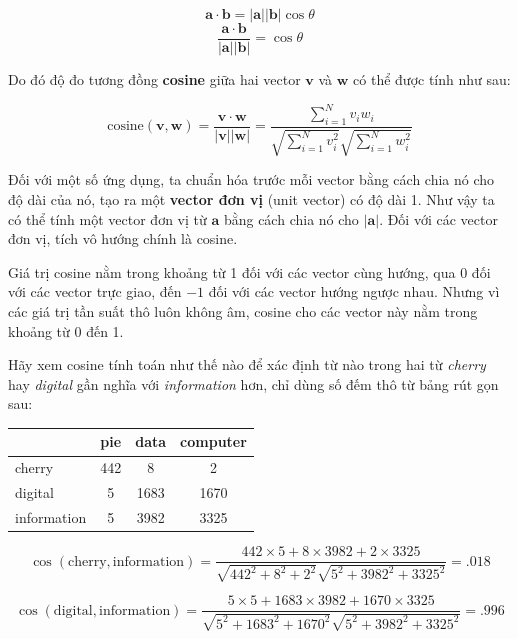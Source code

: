 \begin{equation}
\mathbf{a} \cdot \mathbf{b} = |\mathbf{a}||\mathbf{b}| \cos \theta \tag{5.9}
\end{equation}
$$
\frac{\mathbf{a} \cdot \mathbf{b}}{|\mathbf{a}||\mathbf{b}|} = \cos \theta
$$

Do đó độ đo tương đồng \textbf{cosine} giữa hai vector $\mathbf{v}$ và $\mathbf{w}$ có thể được tính như sau:

\begin{equation}
\text{cosine}(\mathbf{v}, \mathbf{w}) = \frac{\mathbf{v} \cdot \mathbf{w}}{|\mathbf{v}||\mathbf{w}|} = \frac{\sum_{i=1}^{N} v_i w_i}{\sqrt{\sum_{i=1}^{N} v_i^2} \sqrt{\sum_{i=1}^{N} w_i^2}} \tag{5.10}
\end{equation}

Đối với một số ứng dụng, ta chuẩn hóa trước mỗi vector bằng cách chia nó cho độ dài của nó, tạo ra một \textbf{vector đơn vị} (unit vector) có độ dài 1. Như vậy ta có thể tính một vector đơn vị từ $\mathbf{a}$ bằng cách chia nó cho $|\mathbf{a}|$. Đối với các vector đơn vị, tích vô hướng chính là cosine.

Giá trị cosine nằm trong khoảng từ 1 đối với các vector cùng hướng, qua 0 đối với các vector trực giao, đến $-1$ đối với các vector hướng ngược nhau. Nhưng vì các giá trị tần suất thô luôn không âm, cosine cho các vector này nằm trong khoảng từ 0 đến 1.

Hãy xem cosine tính toán như thế nào để xác định từ nào trong hai từ \emph{cherry} hay \emph{digital} gần nghĩa với \emph{information} hơn, chỉ dùng số đếm thô từ bảng rút gọn sau:

\begin{center}
\begin{tabular}{lccc}
 & pie & data & computer \\
\hline
cherry & 442 & 8 & 2 \\
digital & 5 & 1683 & 1670 \\
information & 5 & 3982 & 3325 \\
\end{tabular}
\end{center}

$$
\cos(\text{cherry}, \text{information}) = \frac{442 \times 5 + 8 \times 3982 + 2 \times 3325}{\sqrt{442^2+8^2+2^2}\sqrt{5^2+3982^2+3325^2}} = .018
$$

$$
\cos(\text{digital}, \text{information}) = \frac{5 \times 5 + 1683 \times 3982 + 1670 \times 3325}{\sqrt{5^2+1683^2+1670^2}\sqrt{5^2+3982^2+3325^2}} = .996
$$

